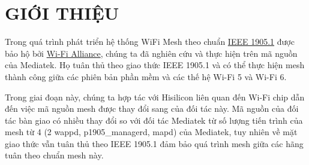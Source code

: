 \chapter{GIỚI THIỆU}
\label{chapter:introduction}

Trong quá trình phát triển hệ thống WiFi Mesh theo chuẩn \href{https://standards.ieee.org/ieee/1905.1/4995/}{IEEE 1905.1} được bảo hộ bởi \href{https://www.wi-fi.org/discover-wi-fi/wi-fi-easymesh}{Wi-Fi Alliance}, chúng ta đã nghiên cứu và thực hiện trên mã nguồn của Mediatek. Họ tuân thủ theo giao thức IEEE 1905.1 và có thể thực hiện mesh thành công giữa các phiên bản phần mềm và các thế hệ Wi-Fi 5 và Wi-Fi 6.

Trong giai đoạn này, chúng ta hợp tác với Hisilicon liên quan đến Wi-Fi chip dẫn đến việc mã nguồn mesh được thay đổi sang của đối tác này. Mã nguồn của đối tác bàn giao có nhiều thay đổi so với đối tác Mediatek từ số lượng tiến trình của mesh từ 4 (2 wappd, p1905\_managerd, mapd) của Mediatek, tuy nhiên về mặt giao thức vẫn tuân thủ theo IEEE 1905.1 đảm bảo quá trình mesh giữa các hãng tuân theo chuẩn mesh này.
